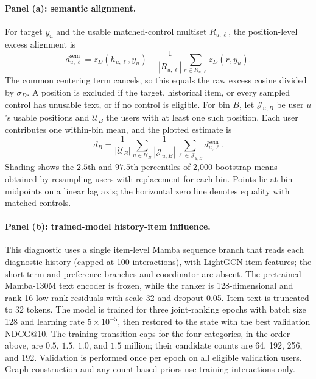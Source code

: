 ﻿\documentclass[sigconf,anonymous,review]{acmart}
\begin{document}
\paragraph{Panel (a): semantic alignment.}
For target $y_u$ and the usable matched-control multiset $R_{u,\ell}$, the position-level excess alignment is
\begin{equation}
 d^{\mathrm{sem}}_{u,\ell}
 =z_D(h_{u,\ell},y_u)
 -\frac{1}{|R_{u,\ell}|}\sum_{r\in R_{u,\ell}}z_D(r,y_u).
 \label{eq:prelim_semantic}
\end{equation}
The common centering term cancels, so this equals the raw excess cosine divided by $\sigma_D$. A position is excluded if the target, historical item, or every sampled control has unusable text, or if no control is eligible. 
For bin $B$, let $\mathcal J_{u,B}$ be user $u$'s usable positions and $\mathcal U_B$ the users with at least one such position. Each user contributes one within-bin mean, and the plotted estimate is
\begin{equation}
 \bar d_B=\frac{1}{|\mathcal U_B|}\sum_{u\in\mathcal U_B}
 \frac{1}{|\mathcal J_{u,B}|}\sum_{\ell\in\mathcal J_{u,B}}
 d^{\mathrm{sem}}_{u,\ell}.
 \label{eq:prelim_bin_mean}
\end{equation}
Shading shows the $2.5$th and $97.5$th percentiles of 2,000 bootstrap means obtained by resampling users with replacement for each bin. Points lie at bin midpoints on a linear lag axis; the horizontal zero line denotes equality with matched controls. 

\paragraph{Panel (b): trained-model history-item influence.}
This diagnostic uses a single item-level Mamba sequence branch that reads each diagnostic history (capped at 100 interactions), with LightGCN item features; the short-term and preference branches and coordinator are absent. The pretrained Mamba-130M text encoder is frozen, while the ranker is 128-dimensional and rank-16 low-rank residuals with scale 32 and dropout 0.05. Item text is truncated to 32 tokens. The model is trained for three joint-ranking epochs with batch size 128 and learning rate $5\times10^{-5}$, then restored to the state with the best validation NDCG@10. The training transition caps for the four categories, in the order above, are $0.5$, $1.5$, $1.0$, and $1.5$ million; their candidate counts are 64, 192, 256, and 192. Validation is performed once per epoch on all eligible validation users. Graph construction and any count-based priors use training interactions only.
\end{document}
